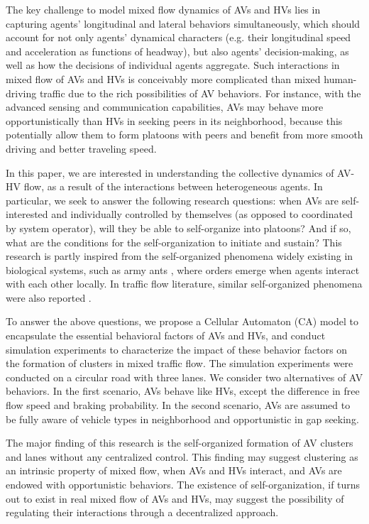 \documentclass[oneside,letter,11pt]{article}
\begin{document}
The key challenge to model mixed flow dynamics of AVs and HVs lies in capturing agents' longitudinal and lateral behaviors simultaneously, which should account for not only agents' dynamical characters (e.g. their longitudinal speed and acceleration as functions of headway), but also agents' decision-making, as well as  how the decisions of individual agents aggregate. Such interactions in mixed flow of AVs and HVs is conceivably more complicated than mixed human-driving traffic due to the rich possibilities of AV behaviors. For instance, with the advanced sensing and communication capabilities, AVs may behave more opportunistically than HVs in seeking peers in its neighborhood, because this potentially allow them to form platoons with peers and benefit from more smooth driving and better traveling speed. 


In this paper, we are interested in understanding the collective dynamics of AV-HV flow, as a result of the interactions between heterogeneous agents. In particular, we seek to answer the following research questions: when AVs are self-interested and individually controlled by themselves (as opposed to coordinated by system operator), will they be able to self-organize into platoons? And if so, what are the conditions for the self-organization to initiate and sustain? This research is partly inspired from the self-organized phenomena widely existing in biological systems, such as army ants \cite{couzin2003self}, where orders emerge when agents interact with each other locally. In traffic flow literature, similar self-organized phenomena were also reported \cite{helbing2001traffic}.


To answer the above questions, we propose a Cellular Automaton (CA) model to encapsulate the essential behavioral factors of AVs and HVs, and conduct simulation experiments to characterize the impact of these behavior factors on the formation of clusters in mixed traffic flow. The simulation experiments were conducted on a circular road with three lanes. We consider two alternatives of AV behaviors. In the first scenario, AVs behave like HVs, except the difference in free flow speed and braking probability. In the second scenario, AVs are assumed to be fully aware of vehicle types in neighborhood and opportunistic in gap seeking.


The major finding of this research is the self-organized formation of AV clusters and lanes without any centralized control. This finding may suggest clustering as an intrinsic property of mixed flow, when AVs and HVs interact, and AVs are endowed with opportunistic behaviors. The existence of self-organization, if turns out to exist in real mixed flow of AVs and HVs, may suggest the possibility of regulating their interactions through a decentralized approach. 
\end{document}
